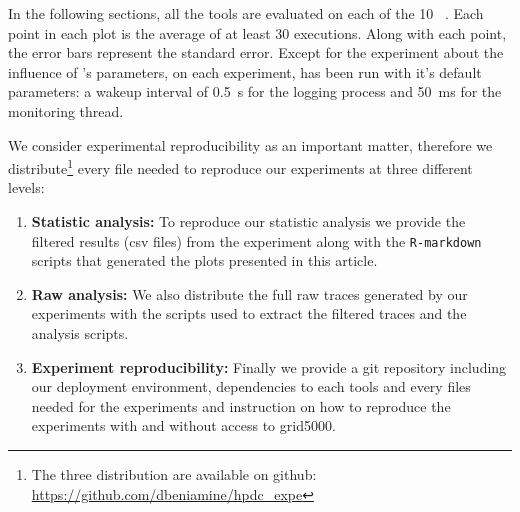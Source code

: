 In the following sections, all the tools are
evaluated on each of the 10 \NPB~\cite{Jin1999}.
Each point in each plot is the average of at least $30$ executions. Along with each point,
the error bars represent the standard error.
Except for the experiment about the influence of \Moca's parameters, on each
experiment, \Moca has been run with it's default parameters: a wakeup interval of
\SI{0.5}{s} for the logging process and \SI{50}{ms} for the monitoring thread.


We consider experimental reproducibility as an important matter, therefore we
distribute\footnote{The three distribution are available on github:\\
    \url{https://github.com/dbeniamine/hpdc_expe}}
every file needed to reproduce our experiments at three different levels:

\begin{enumerate}
    \item \textbf{Statistic analysis:} To reproduce our statistic analysis we provide
        the filtered results (csv files) from the experiment along with the
        \texttt{R-markdown} scripts that generated the plots presented in this
        article.
    \item \textbf{Raw analysis:} We also distribute the full raw traces
        generated by our experiments with the scripts used to extract the
        filtered traces and the analysis scripts.
    \item \textbf{Experiment reproducibility:} Finally we provide a git
        repository including our deployment environment, dependencies to each
        tools and every files needed for the experiments and instruction on
        how to reproduce the experiments with and without access to grid5000.
\end{enumerate}


